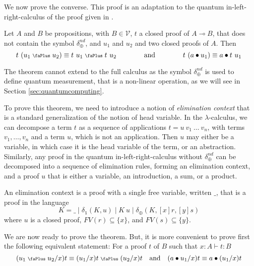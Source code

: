 \documentclass[screen, sigconf,authorversion,nonacm]{acmart}
\theoremstyle{acmdefinition}
\numberwithin{equation}{section}
\newcommand\abstr[1]{[#1]}
\newcommand\plus{\mathrel{\text{\normalfont\scalebox{0.7}{\faPlus}}}}
\newcommand\one{\ensuremath{\mathtt 1}}
\newcommand\elimone{\delta_{\one}}
\newcommand\elimplus{\delta_{\oplus}}
\begin{document}
We now prove the converse.
This proof is an adaptation to the quantum
in-left-right-calculus of the proof given in \cite{DiazcaroDowekMSCS24}.

\begin{theorem}
\label{cor:cor1a}
  Let $A$ and $B$ be propositions, with $B \in {\mathcal V}$, $t$ a
  closed proof of $A \multimap B$, that does not contain the symbol
  $\elimplus^{nd}$, and $u_1$ and $u_2$ and two closed proofs of
  $A$. Then
  $$t~(u_1 \plus u_2) \equiv t~u_1 \plus t~u_2
  \qquad\qquad\textrm{and}\qquad\qquad
  t~(a\bullet u_1) \equiv a\bullet t~u_1$$
\end{theorem}

The theorem cannot extend to the full calculus as the symbol
$\elimplus^{nd}$ is used to define quantum measurement, that is a
non-linear operation, as we will see in Section
\ref{sec:quantumcomputing}.

To prove this theorem, we need to introduce a notion of {\em
  elimination context} that is a standard generalization of the notion
of head variable.  In the $\lambda$-calculus, we can decompose a term
$t$ as a sequence of applications $t = u~v_1~\ldots~v_n$, with terms
$v_1, \ldots, v_n$ and a term $u$, which is not an application.  Then
$u$ may either be a variable, in which case it is the head variable of
the term, or an abstraction.  Similarly, any proof in the quantum
in-left-right-calculus without $\elimplus^{nd}$ can be decomposed into
a sequence of elimination rules, forming an elimination context, and a
proof $u$ that is either a variable, an introduction, a sum, or a
product.

\begin{definition}
  An elimination context is a proof with a single free variable, written
  $\_$, that is a proof in the language
  \[
    K = \_
    \mid \elimone(K,u)
    \mid K~u
    \mid \elimplus(K,\abstr{x}r,\abstr{y}s)
  \]
  where $u$ is a closed proof,
  $FV(r) \subseteq \{x\}$, and $FV(s) \subseteq \{y\}$.
\end{definition}

We are now ready to prove the theorem. But, it is more convenient to
prove first the following equivalent statement: For a proof $t$ of $B$
such that $x:A \vdash t:B$
$$(u_1 \plus u_2/x)t \equiv (u_1/x)t \plus (u_2/x)t
\quad\textrm{and}\quad (a \bullet u_1/x)t \equiv a \bullet (u_1/x)t$$
\end{document}
